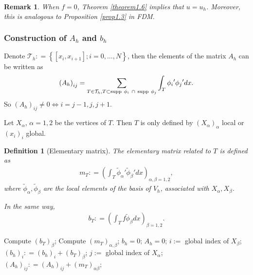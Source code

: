 \documentclass[11pt,a4paper,center,notitlepage]{article}
\numberwithin{equation}{section}
\newtheorem{definition}{Definition}[section]
\newtheorem{remark}{Remark}[section]
\begin{document}
\begin{remark}
When $f=0$, Theorem \ref{theorem1.6} implies that $u=u_h$. Moreover, this is analogous to Proposition \ref{prop1.3} in FDM.
\end{remark}

\subsubsection{Construction of $A_h$ and $b_h$}
Denote ${\mathcal{T}_h}: = \left\{ {\left[ {{x_i},{x_{i + 1}}} \right];i = 0, \ldots ,N} \right\}$, then the elements of the matrix $A_h$ can be written as
\begin{align}
{\left( {{A_h}} \right)_{ij}} = \sum\limits_{T \in {\mathcal{T}_h},T \subset {\rm supp}\ {\phi _i} \ \cap \ {\rm supp}\ {\phi _j}} {\int_T {{\phi _i}'{\phi _j}'dx} } .
\end{align}
So ${\left( {{A_h}} \right)_{ij}} \ne 0 \Leftrightarrow i = j - 1,j,j + 1$. 

Let $X_\alpha$, $\alpha=1,2$ be the vertices of $T$. Then $T$ is only defined by $\left(X_\alpha\right)_\alpha$ local or $\left(x_i\right)_i$ global. 
\begin{definition}[Elementary matrix]
The \emph{elementary matrix} related to $T$ is defined as 
\begin{align}
{m_T}: = {\left( {\int_T {{{\widetilde \phi }_\alpha }'{{\widetilde \phi }_\beta }'dx} } \right)_{\alpha ,\beta  = 1,2}} ,
\end{align}
where ${\widetilde \phi _\alpha },{\widetilde \phi _\beta }$ are the local elements of the basis of $V_h$, associated with $X_\alpha,X_\beta$. 

In the same way, 
\begin{align}
{b_T}: = {\left( {\int_T {f{{\widetilde \phi }_\beta }dx} } \right)_{\beta  = 1,2}} .
\end{align}
\end{definition}
\newpage
\begin{algorithm}[H]
\caption{Elementary matrices and RHS.}
\label{algorithm1}
\begin{algorithmic}[1]
        \State Compute $\left(b_T\right)_\beta$;
            \State Compute $\left(m_T\right)_{\alpha,\beta}$;
        \EndFor
    \EndFor
\EndFor
\State $b_h=0$; $A_h=0$;
        \State $i:=$ global index of $X_\beta$;
        \State ${\left( {{b_h}} \right)_i}: = {\left( {{b_h}} \right)_i} + {\left( {{b_T}} \right)_\beta }$;
            \State $j:=$ global index of $X_\alpha$;
            \State ${\left( {{A_h}} \right)_{ij}}: = {\left( {{A_h}} \right)_{ij}} + {\left( {{m_T}} \right)_{\alpha \beta }}$;
        \EndFor
    \EndFor
\EndFor
\end{algorithmic}
\end{algorithm}
\end{document}
